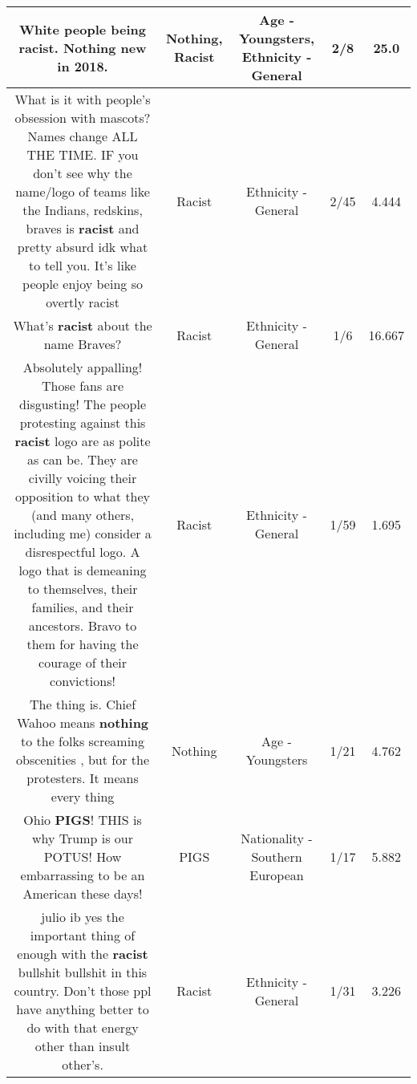 \documentclass[11pt]{article}
\newlength\mylength
\begin{document}
\begin{center}
\begin{longtable}{|C{.65\mylength}|C{.30\mylength}|C{.12\mylength}|C{.12\mylength}|C{.12\mylength}|}
  \small White people being \textbf{racist}. \textbf{Nothing} new in 2018.\normalsize   & Nothing, Racist & Age - Youngsters, Ethnicity - General & 2/8 & 25.0 \\  \hline
  \small What is it with people's obsession with mascots? Names change ALL THE TIME. IF you don't see why the name/logo of teams like the Indians, redskins, braves is \textbf{racist} and pretty absurd idk what to tell you. It's like people enjoy being so overtly racist\normalsize   & Racist & Ethnicity - General & 2/45 & 4.444 \\  \hline
  \small What's \textbf{racist} about the name Braves?\normalsize   & Racist & Ethnicity - General & 1/6 & 16.667 \\  \hline
  \small Absolutely appalling! Those fans are disgusting! The people protesting against this \textbf{racist} logo are as polite as can be. They are civilly voicing their opposition to what they (and many others, including me) consider a disrespectful logo. A logo that is demeaning to themselves, their families, and their ancestors. Bravo to them for having the courage of their convictions!\normalsize   & Racist & Ethnicity - General & 1/59 & 1.695 \\  \hline
  \small The thing is. Chief Wahoo means \textbf{nothing} to the folks screaming obscenities , but for the protesters. It means every thing\normalsize   & Nothing & Age - Youngsters & 1/21 & 4.762 \\  \hline
  \small Ohio \textbf{PIGS}!  THIS is why Trump is our POTUS!  How embarrassing to be an American these days!\normalsize   & PIGS & Nationality - Southern European & 1/17 & 5.882 \\  \hline
  \small julio ib yes the important thing of enough with the \textbf{racist} bullshit bullshit in this country. Don't those ppl have anything better to do with that energy other than insult other's.\normalsize   & Racist & Ethnicity - General & 1/31 & 3.226 \\  \hline

\end{longtable}
\end{center}
\end{document}

